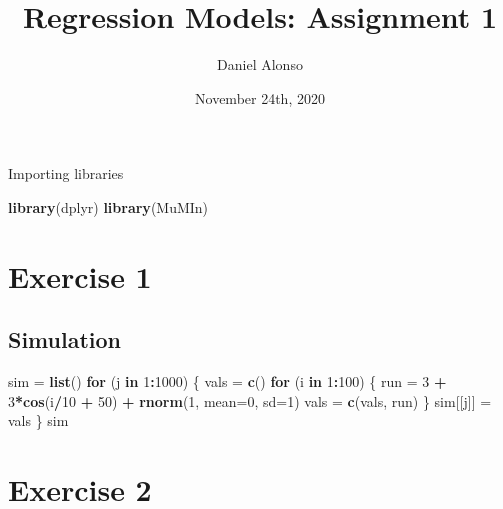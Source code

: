 \documentclass[]{article}
\title{Regression Models: Assignment 1}
\author{Daniel Alonso}
\date{November 24th, 2020}
\newenvironment{Shaded}{\begin{snugshade}}{\end{snugshade}}
\newcommand{\ControlFlowTok}[1]{\textcolor[rgb]{0.13,0.29,0.53}{\textbf{#1}}}
\newcommand{\DataTypeTok}[1]{\textcolor[rgb]{0.13,0.29,0.53}{#1}}
\newcommand{\DecValTok}[1]{\textcolor[rgb]{0.00,0.00,0.81}{#1}}
\newcommand{\KeywordTok}[1]{\textcolor[rgb]{0.13,0.29,0.53}{\textbf{#1}}}
\newcommand{\NormalTok}[1]{#1}
\newcommand{\OperatorTok}[1]{\textcolor[rgb]{0.81,0.36,0.00}{\textbf{#1}}}
\newcommand{\StringTok}[1]{\textcolor[rgb]{0.31,0.60,0.02}{#1}}
\begin{document}
\maketitle

Importing libraries

\begin{Shaded}
\begin{Highlighting}[]
\KeywordTok{library}\NormalTok{(dplyr)}
\KeywordTok{library}\NormalTok{(MuMIn)}
\end{Highlighting}
\end{Shaded}

\hypertarget{exercise-1}{%
\section{Exercise 1}\label{exercise-1}}

\hypertarget{simulation}{%
\subsection{Simulation}\label{simulation}}

\begin{Shaded}
\begin{Highlighting}[]
\NormalTok{sim =}\StringTok{ }\KeywordTok{list}\NormalTok{()}
\ControlFlowTok{for}\NormalTok{ (j }\ControlFlowTok{in} \DecValTok{1}\OperatorTok{:}\DecValTok{1000}\NormalTok{) \{}
\NormalTok{    vals =}\StringTok{ }\KeywordTok{c}\NormalTok{()}
    \ControlFlowTok{for}\NormalTok{ (i }\ControlFlowTok{in} \DecValTok{1}\OperatorTok{:}\DecValTok{100}\NormalTok{) \{}
\NormalTok{        run =}\StringTok{ }\DecValTok{3} \OperatorTok{+}\StringTok{ }\DecValTok{3}\OperatorTok{*}\KeywordTok{cos}\NormalTok{(i}\OperatorTok{/}\DecValTok{10} \OperatorTok{+}\StringTok{ }\DecValTok{50}\NormalTok{) }\OperatorTok{+}\StringTok{ }\KeywordTok{rnorm}\NormalTok{(}\DecValTok{1}\NormalTok{, }\DataTypeTok{mean=}\DecValTok{0}\NormalTok{, }\DataTypeTok{sd=}\DecValTok{1}\NormalTok{)}
\NormalTok{        vals =}\StringTok{ }\KeywordTok{c}\NormalTok{(vals, run)}
\NormalTok{    \}}
\NormalTok{    sim[[j]] =}\StringTok{ }\NormalTok{vals}
\NormalTok{\}}
\NormalTok{sim}
\end{Highlighting}
\end{Shaded}

\hypertarget{exercise-2}{%
\section{Exercise 2}\label{exercise-2}}
\end{document}
